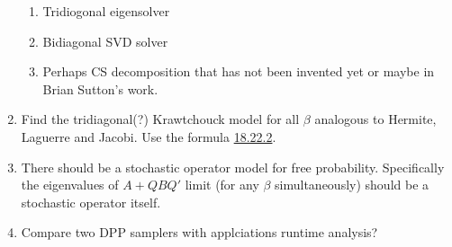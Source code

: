 \documentclass{article}
\begin{document}
\begin{enumerate}
    \begin{enumerate}
        \item Tridiogonal eigensolver
        \item Bidiagonal SVD solver
        \item Perhaps CS decomposition that has not been invented yet or maybe in Brian Sutton's work.
    \end{enumerate}
    \item Find the tridiagonal(?) Krawtchouck model for all $\beta$ analogous to Hermite, Laguerre and Jacobi. Use the formula \href{http://dlmf.nist.gov/18.22#E2}{\color{blue}18.22.2}. 
    \item There should be a stochastic operator model for free probability. Specifically the eigenvalues of $A+QBQ'$ limit (for any $\beta$ simultaneously) should be a stochastic operator itself.
    \item Compare two DPP samplers with applciations runtime analysis?
\end{enumerate}
\end{document}
